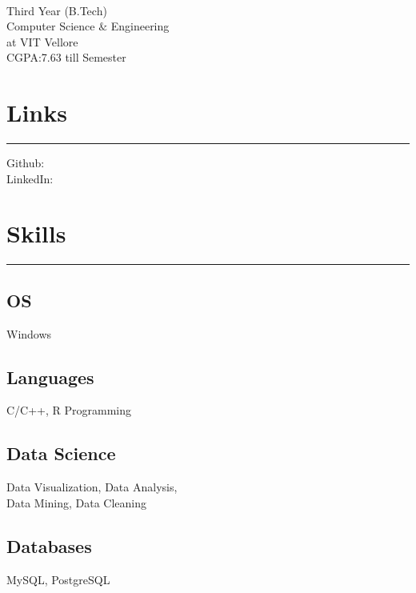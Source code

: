 \documentclass[]{meetresume-class}
\begin{document}
	
	
	\begin{minipage}[t]{0.33\textwidth} 
		\begin{large}
			\\
		\end{large}
		Third Year (B.Tech)\\
		Computer Science $\&$ Engineering\\ 
		at VIT Vellore \\ 
		CGPA:7.63 till  Semester 
		
		
		\section{Links} 
		\noindent\rule{5cm}{0.6pt}
		
		Github: \href{https://github.com/MeetDarkPow}{} \\
		LinkedIn:  \href{https://www.linkedin.com/in/meet-bhatnagar-a41842181/}{}
		
		\section{Skills}
		\noindent\rule{5cm}{0.6pt}
		
		\subsection{OS}
		Windows
		\vspace{6pt}
		\subsection{Languages}
		C/C++, R Programming
		\vspace{6pt}
		\subsection{Data Science}
		Data Visualization, Data Analysis,\\
		Data Mining, Data Cleaning
		\vspace{6pt}
		\subsection{Databases}
		MySQL, PostgreSQL
		\vspace{6pt}

\end{minipage}
\end{document}
